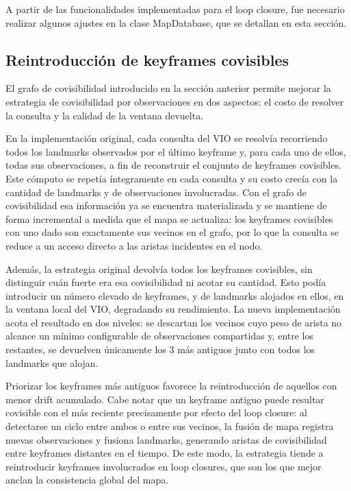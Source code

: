 A partir de las funcionalidades implementadas para el loop closure, fue necesario realizar algunos
ajustes en la clase MapDatabase, que se detallan en esta sección.

\subsection{Reintroducción de keyframes covisibles}

El grafo de covisibilidad introducido en la sección anterior permite mejorar la estrategia de covisibilidad por observaciones en dos aspectos: el costo de resolver la consulta y la calidad de la ventana devuelta.

En la implementación original, cada consulta del VIO se resolvía recorriendo todos los landmarks observados por el último keyframe y, para cada uno de ellos, todas sus observaciones, a fin de reconstruir el conjunto de keyframes covisibles. Este cómputo se repetía íntegramente en cada consulta y su costo crecía con la cantidad de landmarks y de observaciones involucradas. Con el grafo de covisibilidad esa información ya se encuentra materializada y se mantiene de forma incremental a medida que el mapa se actualiza: los keyframes covisibles con uno dado son exactamente sus vecinos en el grafo, por lo que la consulta se reduce a un acceso directo a las aristas incidentes en el nodo.

Además, la estrategia original devolvía todos los keyframes covisibles, sin distinguir cuán fuerte era esa covisibilidad ni acotar su cantidad. Esto podía introducir un número elevado de keyframes, y de landmarks alojados en ellos, en la ventana local del VIO, degradando su rendimiento. La nueva implementación acota el resultado en dos niveles: se descartan los vecinos cuyo peso de arista no alcance un mínimo configurable de observaciones compartidas y, entre los restantes, se devuelven únicamente los 3 más antiguos junto con todos los landmarks que alojan.

Priorizar los keyframes más antiguos favorece la reintroducción de aquellos con menor drift acumulado. Cabe notar que un keyframe antiguo puede resultar covisible con el más reciente precisamente por efecto del loop closure: al detectarse un ciclo entre ambos o entre sus vecinos, la fusión de mapa registra nuevas observaciones y fusiona landmarks, generando aristas de covisibilidad entre keyframes distantes en el tiempo. De este modo, la estrategia tiende a reintroducir keyframes involucrados en loop closures, que son los que mejor anclan la consistencia global del mapa.

